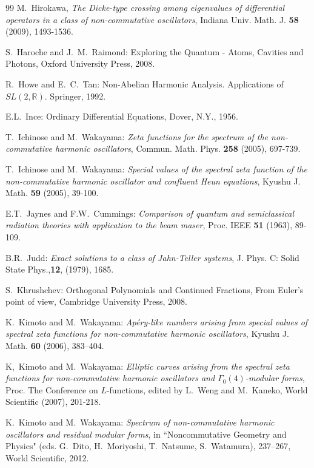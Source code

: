\documentclass[11pt]{article}
\numberwithin{equation}{section}
\newcommand{\R}{\mathbb{R}} %
\theoremstyle{plain}
\theoremstyle{definition}
\theoremstyle{remark}
\begin{document}
\begin{thebibliography}{99}
  M.~Hirokawa,
  \textit{The Dicke-type crossing among eigenvalues of differential operators in a class of non-commutative oscillators},
  Indiana Univ. Math. J. \textbf{58} (2009), 1493-1536.

  S.~Haroche and J.~M.~Raimond:
  Exploring the Quantum - Atoms, Cavities and Photons, Oxford University Press, 2008.

  R.~Howe and E.~C.~Tan:
  Non-Abelian Harmonic Analysis. Applications of $SL(2,\R)$. Springer, 1992.

  E.L.~Ince:
  Ordinary Differential Equations, Dover, N.Y., 1956.

  T.~Ichinose and M.~Wakayama:
  \textit{Zeta functions for the spectrum of the non-commutative harmonic oscillators},
  Commun. Math. Phys. \textbf{258} (2005), 697-739.

T.~Ichinose and M.~Wakayama:
\textit{Special values of the spectral zeta function of the non-commutative harmonic oscillator and confluent Heun equations},
Kyushu J. Math. \textbf{59} (2005), 39-100.

  E.T.~Jaynes and F.W.~Cummings:
  \textit{Comparison of quantum and semiclassical radiation theories with application to the beam maser},
  Proc. IEEE  \textbf{51} (1963), 89-109.

  B.R.~Judd:
  \textit{Exact solutions to a class of Jahn-Teller systems}, J. Phys. C: Solid State Phys.,\textbf{12}, (1979), 1685.
  
  S.~Khrushchev:
  Orthogonal Polynomials and Continued Fractions, From Euler's point of view, Cambridge University Press, 2008.

K.~Kimoto and M.~Wakayama:
\textit{Ap\'ery-like numbers arising from special values of spectral zeta functions for non-commutative harmonic oscillators},
Kyushu J. Math. \textbf{60} (2006), 383--404.

  K,~Kimoto and M.~Wakayama:
  \textit{Elliptic curves arising from the spectral zeta functions for non-commutative harmonic oscillators and $\Gamma_0(4)$-modular forms}, Proc.  The Conference on $L$-functions, edited by  L.~Weng and M.~Kaneko, World Scientific (2007), 201-218.

  K.~Kimoto and M.~Wakayama:
  \textit{Spectrum of non-commutative harmonic oscillators and residual modular forms},
  in ``Noncommutative Geometry and Physics" (eds. G.~Dito, H.~Moriyoshi,  T.~Natsume, S.~Watamura),
  237--267, World Scientific, 2012.


\end{thebibliography}
\end{document}
